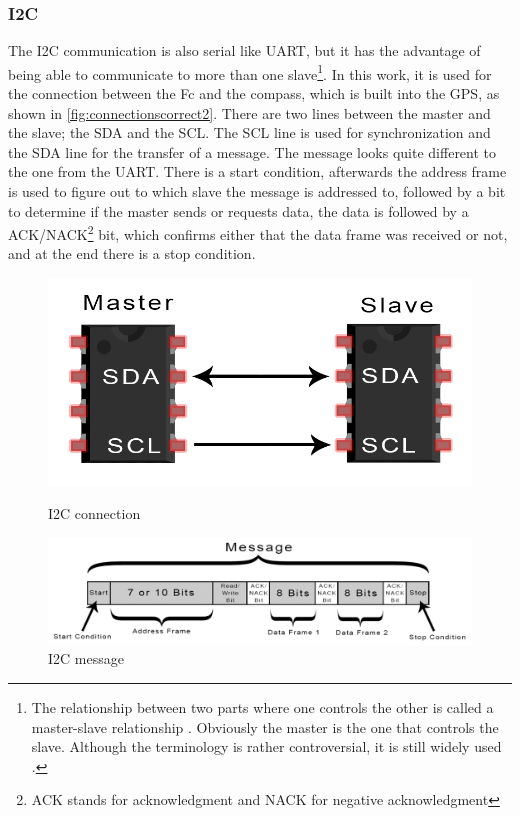 \documentclass[svgnames]{article}
\begin{document}
	\subsubsection{I2C}
	The \gls{I2C} communication is also serial like \gls{UART}, but it has the advantage of being able to communicate to more than one slave\footnote{The relationship between two parts where one controls the other is called a master-slave relationship \cite{i2cprotocol}. Obviously the master is the one that controls the slave. Although the terminology is rather controversial, it is still widely used \cite{masterslave}.}. In this work, it is used for the connection between the \gls{Fc} and the compass, which is built into the \gls{GPS}, as shown in \cref{fig:connectionscorrect2}. There are two lines between the master and the slave; the \gls{SDA} and the \gls{SCL}. The \gls{SCL} line is used for synchronization and the \gls{SDA} line for the transfer of a message. The message looks quite different to the one from the \gls{UART}. There is a start condition, afterwards the address frame is used to figure out to which slave the message is addressed to, followed by a bit to determine if the master sends or requests data, the data is followed by a ACK/NACK\footnote{ACK stands for acknowledgment and NACK for negative acknowledgment} bit, which confirms either that the data frame was received or not, and at the end there is a stop condition.
	\newpage
\begin{figure}[ht]
	\begin{minipage}[c]{0.4\textwidth}
		\includegraphics[width=\textwidth]{pictures/I2Cconnection}
		\caption{\gls{I2C} connection \cite{i2cprotocol}}
		\label{fig:I2Cconnection}
	\end{minipage}
	\hfill
	\begin{minipage}[c]{0.4\textwidth}
		\includegraphics[width=\textwidth]{pictures/I2Cpackage}
		\caption{\gls{I2C} message \cite{i2cprotocol}}
		\label{fig:I2Cpackage}
	\end{minipage}
\end{figure}
\end{document}
